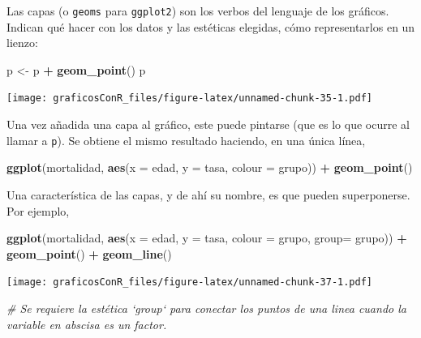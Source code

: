 \documentclass[]{article}
\newenvironment{Shaded}{\begin{snugshade}}{\end{snugshade}}
\newcommand{\CommentTok}[1]{\textcolor[rgb]{0.56,0.35,0.01}{\textit{#1}}}
\newcommand{\DataTypeTok}[1]{\textcolor[rgb]{0.13,0.29,0.53}{#1}}
\newcommand{\KeywordTok}[1]{\textcolor[rgb]{0.13,0.29,0.53}{\textbf{#1}}}
\newcommand{\NormalTok}[1]{#1}
\newcommand{\OperatorTok}[1]{\textcolor[rgb]{0.81,0.36,0.00}{\textbf{#1}}}
\newcommand{\StringTok}[1]{\textcolor[rgb]{0.31,0.60,0.02}{#1}}
\numberwithin{ejcnt}{section}
\begin{document}
Las capas (o \texttt{geoms} para \texttt{ggplot2}) son los verbos del lenguaje de los gráficos. Indican qué hacer con los datos y las estéticas elegidas, cómo representarlos en un lienzo:

\begin{Shaded}
\begin{Highlighting}[]
\NormalTok{p <-}\StringTok{ }\NormalTok{p }\OperatorTok{+}\StringTok{ }\KeywordTok{geom_point}\NormalTok{()}
\NormalTok{p}
\end{Highlighting}
\end{Shaded}

\texttt{[image: graficosConR\_files/figure-latex/unnamed-chunk-35-1.pdf]}

Una vez añadida una capa al gráfico, este puede pintarse (que es lo que ocurre al llamar a \texttt{p}). Se obtiene el mismo resultado haciendo, en una única línea,

\begin{Shaded}
\begin{Highlighting}[]
\KeywordTok{ggplot}\NormalTok{(mortalidad, }\KeywordTok{aes}\NormalTok{(}\DataTypeTok{x =}\NormalTok{ edad, }\DataTypeTok{y =}\NormalTok{ tasa, }\DataTypeTok{colour =}\NormalTok{ grupo)) }\OperatorTok{+}\StringTok{ }\KeywordTok{geom_point}\NormalTok{()}
\end{Highlighting}
\end{Shaded}

Una característica de las capas, y de ahí su nombre, es que pueden superponerse. Por ejemplo,

\begin{Shaded}
\begin{Highlighting}[]
\KeywordTok{ggplot}\NormalTok{(mortalidad, }\KeywordTok{aes}\NormalTok{(}\DataTypeTok{x =}\NormalTok{ edad, }\DataTypeTok{y =}\NormalTok{ tasa, }\DataTypeTok{colour =}\NormalTok{ grupo, }\DataTypeTok{group=}\NormalTok{ grupo)) }\OperatorTok{+}\StringTok{ }
\StringTok{  }\KeywordTok{geom_point}\NormalTok{() }\OperatorTok{+}\StringTok{ }\KeywordTok{geom_line}\NormalTok{()}
\end{Highlighting}
\end{Shaded}

\texttt{[image: graficosConR\_files/figure-latex/unnamed-chunk-37-1.pdf]}

\begin{Shaded}
\begin{Highlighting}[]
\CommentTok{# Se requiere la estética `group` para conectar los puntos de una linea cuando la variable en abscisa es un factor.}
\end{Highlighting}
\end{Shaded}
\end{document}

